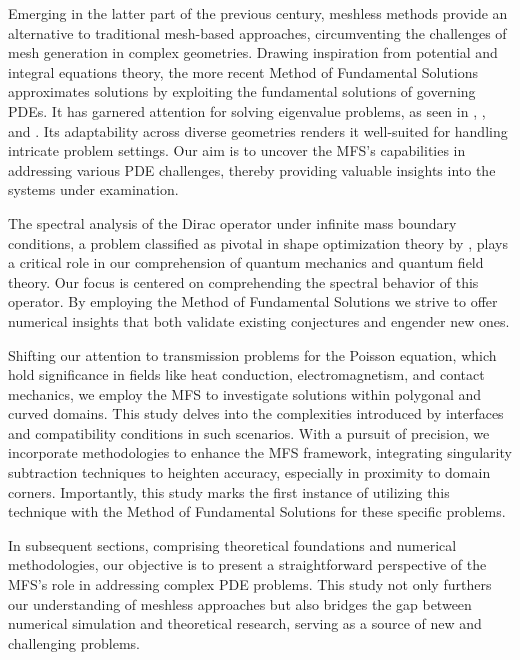 Emerging in the latter part of the previous century, meshless methods provide an alternative to traditional mesh-based approaches, circumventing the challenges of mesh generation in complex geometries. Drawing inspiration from potential and integral equations theory, the more recent Method of Fundamental Solutions approximates solutions by exploiting the fundamental solutions of governing \ac{PDE}s. It has garnered attention for solving eigenvalue problems, as seen in \cite{alves2013method}, \cite{reutskiy2006method}, and \cite{antunes2011inverse}. Its adaptability across diverse geometries renders it well-suited for handling intricate problem settings. Our aim is to uncover the MFS's capabilities in addressing various \ac{PDE} challenges, thereby providing valuable insights into the systems under examination.

The spectral analysis of the Dirac operator under infinite mass boundary conditions, a problem classified as pivotal in shape optimization theory by \cite{krejcirik_larson_lotoreichik_2019}, plays a critical role in our comprehension of quantum mechanics and quantum field theory. Our focus is centered on comprehending the spectral behavior of this operator. By employing the Method of Fundamental Solutions we strive to offer numerical insights that both validate existing conjectures and engender new ones.

Shifting our attention to transmission problems for the Poisson equation, which hold significance in fields like heat conduction, electromagnetism, and contact mechanics, we employ the MFS to investigate solutions within polygonal and curved domains. This study delves into the complexities introduced by interfaces and compatibility conditions in such scenarios. With a pursuit of precision, we incorporate methodologies to enhance the MFS framework, integrating singularity subtraction techniques to heighten accuracy, especially in proximity to domain corners. Importantly, this study marks the first instance of utilizing this technique with the Method of Fundamental Solutions for these specific problems.

In subsequent sections, comprising theoretical foundations and numerical methodologies, our objective is to present a straightforward perspective of the MFS's role in addressing complex \ac{PDE} problems. This study not only furthers our understanding of meshless approaches but also bridges the gap between numerical simulation and theoretical research, serving as a source of new and challenging problems.



